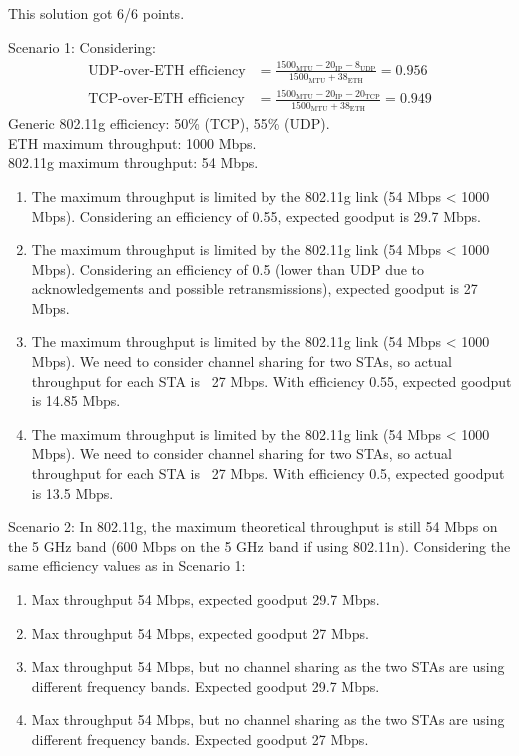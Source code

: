 \begin{solution}
    This solution got 6/6 points.

    Scenario 1:
    Considering:
    \begin{align*}
    \text{UDP-over-ETH efficiency} &= \frac{1500_{\text{MTU}} - 20_{\text{IP}} - 8_{\text{UDP}}}{1500_{\text{MTU}} + 38_{\text{ETH}}} = 0.956 \\
    \text{TCP-over-ETH efficiency} &= \frac{1500_{\text{MTU}} - 20_{\text{IP}} - 20_{\text{TCP}}}{1500_{\text{MTU}} + 38_{\text{ETH}}} = 0.949
    \end{align*}
    Generic 802.11g efficiency: 50\% (TCP), 55\% (UDP). \\
    ETH maximum throughput: 1000 Mbps. \\
    802.11g maximum throughput: 54 Mbps.
    \begin{enumerate}
        \item The maximum throughput is limited by the 802.11g link (54 Mbps < 1000 Mbps). Considering an efficiency of 0.55, expected goodput is 29.7 Mbps.
        \item The maximum throughput is limited by the 802.11g link (54 Mbps < 1000 Mbps). Considering an efficiency of 0.5 (lower than UDP due to acknowledgements and possible retransmissions), expected goodput is 27 Mbps.
        \item The maximum throughput is limited by the 802.11g link (54 Mbps < 1000 Mbps). We need to consider channel sharing for two STAs, so actual throughput for each STA is ~27 Mbps. With efficiency 0.55, expected goodput is 14.85 Mbps.
        \item The maximum throughput is limited by the 802.11g link (54 Mbps < 1000 Mbps). We need to consider channel sharing for two STAs, so actual throughput for each STA is ~27 Mbps. With efficiency 0.5, expected goodput is 13.5 Mbps.
    \end{enumerate}

    Scenario 2:
    In 802.11g, the maximum theoretical throughput is still 54 Mbps on the 5 GHz band (600 Mbps on the 5 GHz band if using 802.11n).
    Considering the same efficiency values as in Scenario 1:
    \begin{enumerate}
        \item Max throughput 54 Mbps, expected goodput 29.7 Mbps.
        \item Max throughput 54 Mbps, expected goodput 27 Mbps.
        \item Max throughput 54 Mbps, but no channel sharing as the two STAs are using different frequency bands. Expected goodput 29.7 Mbps.
        \item Max throughput 54 Mbps, but no channel sharing as the two STAs are using different frequency bands. Expected goodput 27 Mbps.
    \end{enumerate}


\end{solution}
